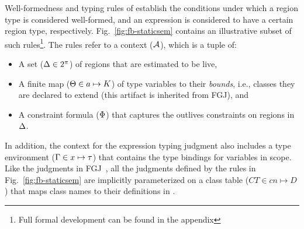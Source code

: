 Well-formedness and typing rules of \fbname establish the conditions
under which a region type is considered well-formed, and an expression
is considered to have a certain region type, respectively.
Fig.~\ref{fig:fb-staticsem} contains an illustrative subset of such
rules\footnote{Full formal development can be found in the
appendix}. The rules refer to a context (${\mathcal{A}}$), which is a tuple of:
\begin{itemize}
\item A set ($\Delta \in 2^\pi$) of regions that are estimated to be
live,
\item A finite map ($\Theta \in a \mapsto K$) of type
variables to their \emph{bounds}, i.e., classes they are declared to
extend (this artifact is inherited from FGJ), and
\item A constraint formula ($\Phi$) that captures the outlives
constraints on regions in $\Delta$.
\end{itemize}
In addition, the context for the expression typing judgment also
includes a type environment ($\Gamma \in x \mapsto \tau$) that contains
the type bindings for variables in scope. Like the judgments in
FGJ~\cite{fgj}, all the judgments defined by the rules in
Fig.~\ref{fig:fb-staticsem} are implicitly parameterized on a class
table ($CT \in cn \mapsto D$) that maps class names to their
definitions in \FB.

